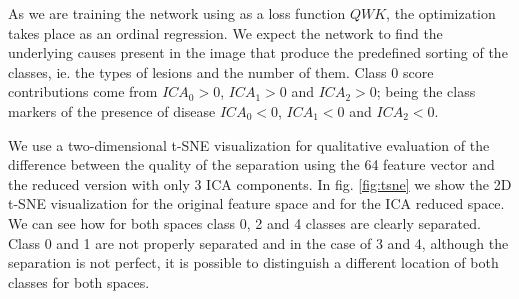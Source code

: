 \documentclass[review]{elsarticle}
\theoremstyle{definition} %
\theoremstyle{remark}
\begin{document}
As we are training the network using as a loss function $QWK$, the optimization takes place as an ordinal regression. We expect the network to find the underlying causes present in the image that produce the predefined sorting of the classes, ie. the types of lesions and the number of them. Class 0 score contributions come from $ICA_0 > 0$, $ICA_1 > 0$ and $ICA_2 > 0$; being the class markers of the presence of disease $ICA_0 < 0$, $ICA_1 < 0$ and $ICA_2 < 0$.

We use a two-dimensional t-SNE visualization \cite{maaten2008visualizing} for qualitative evaluation of the difference between the quality of the separation using the 64 feature vector and the reduced version with only 3 ICA components. In fig. \ref{fig:tsne} we show the 2D t-SNE visualization for the original feature space and for the ICA reduced space. We can see how for both spaces class 0, 2 and 4 classes are clearly separated. Class 0 and 1 are not properly separated and in the case of 3 and 4, although the separation is not perfect, it is possible to distinguish a different location of both classes for both spaces. 
\end{document}
